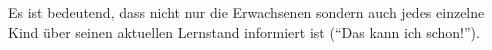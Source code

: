 Es ist bedeutend, dass nicht nur die Erwachsenen sondern auch jedes einzelne Kind über seinen aktuellen Lernstand informiert ist (``Das kann ich schon!'').